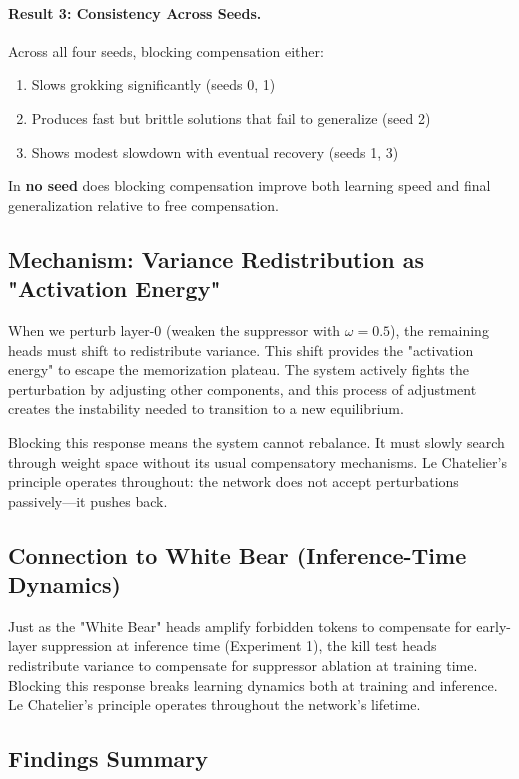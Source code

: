 \paragraph{Result 3: Consistency Across Seeds.}
Across all four seeds, blocking compensation either:
\begin{enumerate}
\item Slows grokking significantly (seeds 0, 1)
\item Produces fast but brittle solutions that fail to generalize (seed 2)
\item Shows modest slowdown with eventual recovery (seeds 1, 3)
\end{enumerate}

In \textbf{no seed} does blocking compensation improve both learning speed and final generalization relative to free compensation.

\subsection{Mechanism: Variance Redistribution as "Activation Energy"}

When we perturb layer-0 (weaken the suppressor with $\omega = 0.5$), the remaining heads must shift to redistribute variance. This shift provides the "activation energy" to escape the memorization plateau. The system actively fights the perturbation by adjusting other components, and this process of adjustment creates the instability needed to transition to a new equilibrium.

Blocking this response means the system cannot rebalance. It must slowly search through weight space without its usual compensatory mechanisms. Le Chatelier's principle operates throughout: the network does not accept perturbations passively—it pushes back.

\subsection{Connection to White Bear (Inference-Time Dynamics)}

Just as the "White Bear" heads amplify forbidden tokens to compensate for early-layer suppression at inference time (Experiment 1), the kill test heads redistribute variance to compensate for suppressor ablation at training time. Blocking this response breaks learning dynamics both at training and inference. Le Chatelier's principle operates throughout the network's lifetime.

\subsection{Findings Summary}

